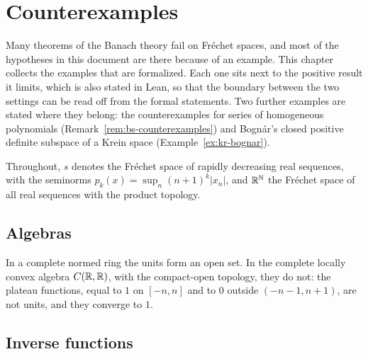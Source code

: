 \chapter{Counterexamples}
\label{chap:counterexamples}

Many theorems of the Banach theory fail on Fréchet spaces, and most of the hypotheses in this
document are there because of an example. This chapter collects the examples that are
formalized. Each one sits next to the positive result it limits, which is also stated in Lean,
so that the boundary between the two settings can be read off from the formal statements. Two
further examples are stated where they belong: the counterexamples for series of homogeneous
polynomials (Remark~\ref{rem:bs-counterexamples}) and Bognár's closed positive definite subspace
of a Krein space (Example~\ref{ex:kr-bognar}).

Throughout, $s$ denotes the Fréchet space of rapidly decreasing real sequences, with the
seminorms $p_k(x) = \sup_n (n + 1)^k |x_n|$, and $\mathbb{R}^{\mathbb{N}}$ the Fréchet space of all real
sequences with the product topology.

\section{Algebras}

\begin{example}
  \label{ex:ce-units}
  \leanok
  In a complete normed ring the units form an open set. In the complete locally convex algebra
  $C(\mathbb{R}, \mathbb{R})$, with the compact-open topology, they do not: the plateau functions, equal to $1$ on
  $[-n, n]$ and to $0$ outside $(-n-1, n+1)$, are not units, and they converge to $1$.
\end{example}

\section{Inverse functions}

